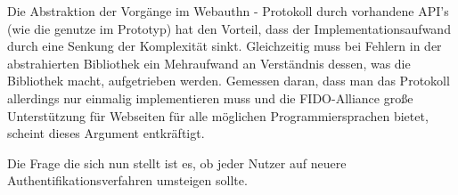 Die Abstraktion der Vorgänge im Webauthn - Protokoll durch vorhandene API's (wie die genutze im Prototyp) hat den Vorteil, dass der Implementationsaufwand durch eine Senkung der Komplexität sinkt. Gleichzeitig muss bei Fehlern in der abstrahierten Bibliothek ein Mehraufwand an Verständnis dessen, was die Bibliothek macht, aufgetrieben werden. Gemessen daran, dass man das Protokoll allerdings nur einmalig implementieren muss und die FIDO-Alliance große Unterstützung für Webseiten für alle möglichen Programmiersprachen bietet, scheint dieses Argument entkräftigt.

Die Frage die sich nun stellt ist es, ob jeder Nutzer auf neuere Authentifikationsverfahren umsteigen sollte.
